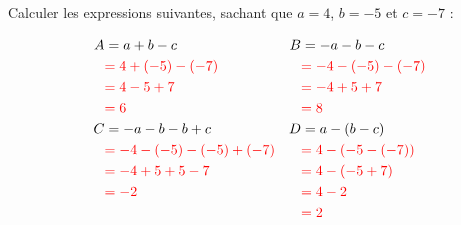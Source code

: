 \documentclass[Controlev1-correction]{subfiles}
\begin{document}
\begin{exercice}[(6 points)]

	Calculer les expressions suivantes, sachant que $a = 4$, $b = -5$ et $c = -7$ :

	\begin{align*}
		A & = a + b - c                            & B & = -a - b - c                    \\
		  & \correction{= 4 + (-5) - (-7)}         &   & \correction{= -4 - (-5) - (-7)} \\
		  & \correction{= 4 - 5 + 7}               &   & \correction{= -4 + 5 + 7}       \\
		  & \correction{= 6}                       &   & \correction{= 8}                \\
		C & = -a - b - b + c                       & D & = a - (b - c)                   \\
		  & \correction{= -4 - (-5) - (-5) + (-7)} &   & \correction{= 4 - (-5 - (-7))}  \\
		  & \correction{= -4 + 5 + 5 - 7}          &   & \correction{= 4 - (-5 + 7)}     \\
		  & \correction{= -2}                      &   & \correction{= 4 - 2}            \\
		  &                                        &   & \correction{= 2}                \\
	\end{align*}
\end{exercice}
\end{document}
